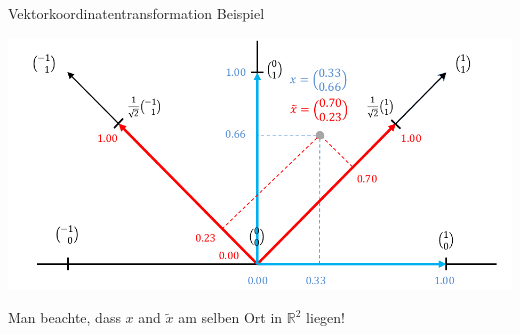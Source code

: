 \documentclass[
  8pt,
  ignorenonframetext,
]{beamer}
\begin{document}
\begin{frame}{Vektorkoordinatentransformation}
\protect\hypertarget{vektorkoordinatentransformation-5}{}
Beispiel \vspace{3mm}

\begin{center}\includegraphics[width=1\linewidth]{4_Abbildungen/mvda_4_vektorkoordinatentransformation} \end{center}
\center
\vspace{1mm}
\small

Man beachte, dass \(x\) and \(\tilde{x}\) am selben Ort in
\(\mathbb{R}^2\) liegen!
\end{frame}
\end{document}
